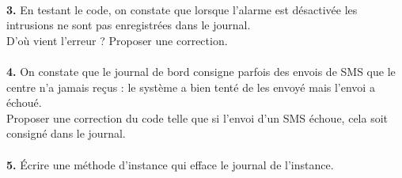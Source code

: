 \documentclass[article,a4paper,firamath,12pt]{nsi}
\begin{document}
\\

\textbf{3.} En testant le code, on constate que lorsque l'alarme est désactivée les intrusions ne sont pas enregistrées dans le journal.\\
D'où vient l'erreur ? Proposer une correction.\\

\\

\textbf{4.} On constate que le journal de bord consigne parfois des envois de SMS que le centre n'a jamais reçus : le système a bien tenté de les envoyé mais l'envoi a échoué.\\
Proposer une correction du code telle que si l'envoi d'un SMS échoue, cela soit consigné dans le journal.\\

\\

\textbf{5.} \'Ecrire une méthode d'instance  qui efface le journal de l'instance.\\


\end{document}
